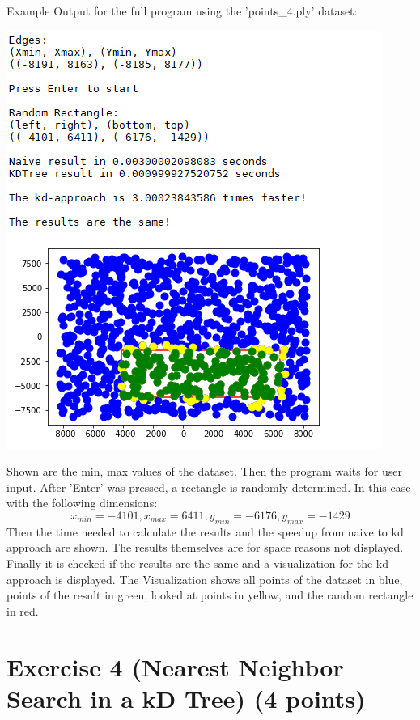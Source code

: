 \documentclass[english, fontsize=12pt, paper=a4, twoside=false, draft=true, pagesize=auto, version=last, DIV=16]{scrartcl}
\theoremstyle{break}
\begin{document}
\newpage

Example Output for the full program using the 'points\_4.ply' dataset:
\begin{center}
  \includegraphics{./images/task3.png}
\end{center}

Shown are the min, max values of the dataset. Then the program waits for user input.
After 'Enter' was pressed, a rectangle is randomly determined. In this case with the following dimensions:
\[x_{min}=-4101, x_{max}=6411, y_{min}=-6176, y_{max}=-1429\]
Then the time needed to calculate the results and the speedup from naive to kd approach are shown. The results themselves are for space reasons not displayed.
Finally it is checked if the results are the same and a visualization for the kd approach is displayed.
The Visualization shows all points of the dataset in blue, points of the result in green, looked at points in yellow, and the random rectangle in red.


\newpage

\section*{\large Exercise 4 (Nearest Neighbor Search in a kD Tree) {\normalsize \hfill (4 points)}}
\end{document}
